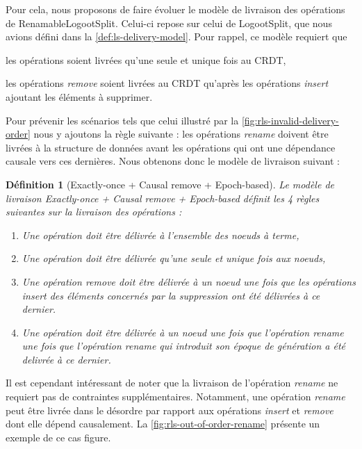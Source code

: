 \documentclass[12pt]{thesul}
\newtheorem{definition}{Définition}
\begin{document}
Pour cela, nous proposons de faire évoluer le modèle de livraison des opérations de RenamableLogootSplit.
Celui-ci repose sur celui de LogootSplit, que nous avions défini dans la \autoref{def:ls-delivery-model}.
Pour rappel, ce modèle requiert que
\begin{enumerate*}[label=(\roman*)]
  \item les opérations soient livrées qu'une seule et unique fois au \ac{CRDT},
  \item les opérations \emph{remove} soient livrées au \ac{CRDT} qu'après les opérations \emph{insert} ajoutant les éléments à supprimer.
\end{enumerate*}

Pour prévenir les scénarios tels que celui illustré par la \autoref{fig:rls-invalid-delivery-order} nous y ajoutons la règle suivante : les opérations \emph{rename} doivent être livrées à la structure de données avant les opérations qui ont une dépendance causale vers ces dernières.
Nous obtenons donc le modèle de livraison suivant :

\begin{definition}[Exactly-once + Causal remove + Epoch-based]
  \label{def:rls-delivery-model}
  Le modèle de livraison \emph{Exactly-once + Causal remove + Epoch-based} définit les 4 règles suivantes sur la livraison des opérations :
  \begin{enumerate}
    \item Une opération doit être délivrée à l'ensemble des noeuds à terme,
    \item Une opération doit être délivrée qu'une seule et unique fois aux noeuds,
    \item Une opération \emph{remove} doit être délivrée à un noeud une fois que les opérations \emph{insert} des éléments concernés par la suppression ont été délivrées à ce dernier.
    \item Une opération doit être délivrée à un noeud une fois que l'opération \emph{rename} une fois que l'opération \emph{rename} qui introduit son époque de génération a été delivrée à ce dernier.
  \end{enumerate}
\end{definition}

Il est cependant intéressant de noter que la livraison de l'opération \emph{rename} ne requiert pas de contraintes supplémentaires.
Notamment, une opération \emph{rename} peut être livrée dans le désordre par rapport aux opérations \emph{insert} et \emph{remove} dont elle dépend causalement.
La \autoref{fig:rls-out-of-order-rename} présente un exemple de ce cas figure.
\end{document}

